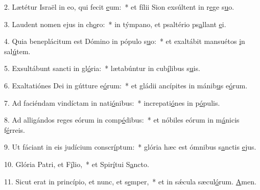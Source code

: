 2. Lætétur Israël in eo, qui fecit \uline{e}um:~* et fílii Sion exsúltent in r\uline{e}ge s\uline{u}o.\par 
3. Laudent nomen ejus in ch\uline{o}ro:~* in týmpano, et psaltério ps\uline{a}llant \uline{e}i.\par 
4. Quia beneplácitum est Dómino in pópulo s\uline{u}o:~* et exaltábit mansuétos \uline{i}n sal\uline{ú}tem.\par 
5. Exsultábunt sancti in gl\uline{ó}ria:~* lætabúntur in cub\uline{í}libus s\uline{u}is.\par 
6. Exaltatiónes Dei in gútture e\uline{ó}rum:~* et gládii ancípites in mánib\uline{u}s e\uline{ó}rum.\par 
7. Ad faciéndam vindíctam in nati\uline{ó}nibus:~* increpati\uline{ó}nes in p\uline{ó}pulis.\par 
8. Ad alligándos reges eórum in comp\uline{é}dibus:~* et nóbiles eórum in m\uline{á}nicis f\uline{é}rreis.\par 
9. Ut fáciant in eis judícium conscr\uline{í}ptum:~* glória hæc est ómnibus s\uline{a}nctis \uline{e}jus.\par 
10. Glória Patri, et F\uline{í}lio,~* et Spir\uline{í}tui S\uline{a}ncto.\par 
11. Sicut erat in princípio, et nunc, et s\uline{e}mper,~* et in sǽcula sæcul\uline{ó}rum. \uline{A}men.\par 
